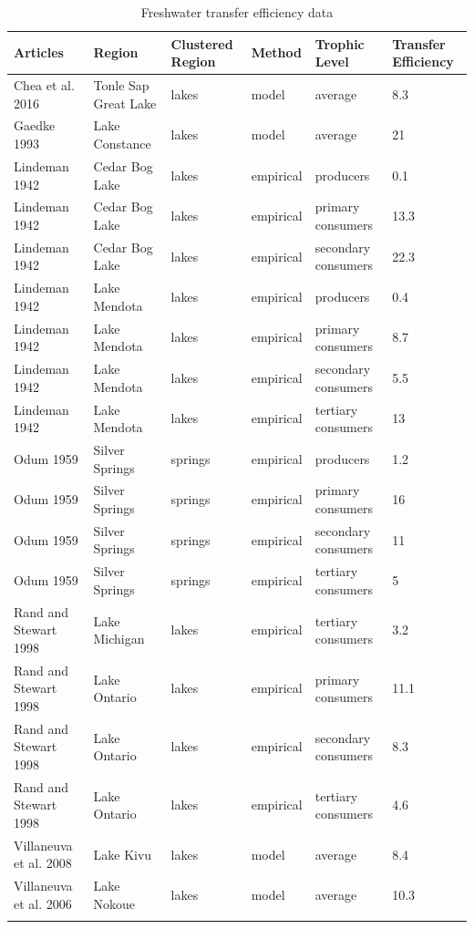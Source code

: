 \documentclass[oneside,12pt,final]{sty/ucthesis-CA2012}
\begin{document}
\begin{mainmatter}
\small %
\begin{longtable} {p{3cm}p{3cm}p{1.8cm}lp{2cm}p{1.7cm}} 
	\toprule
    Articles & Region & Clustered Region & Method & Trophic Level & Transfer Efficiency \\
    \midrule
    Chea et al. 2016   & Tonle Sap Great Lake & lakes & model & average & 8.3 \\
    Gaedke 1993   & Lake Constance & lakes & model & average & 21 \\
    Lindeman 1942   & Cedar Bog Lake & lakes & empirical & producers & 0.1 \\
    Lindeman 1942   & Cedar Bog Lake & lakes & empirical & primary consumers & 13.3 \\
    Lindeman 1942   & Cedar Bog Lake & lakes & empirical & secondary consumers & 22.3 \\
    Lindeman 1942   & Lake Mendota & lakes & empirical & producers & 0.4 \\
    Lindeman 1942   & Lake Mendota & lakes & empirical & primary consumers & 8.7 \\
    Lindeman 1942   & Lake Mendota & lakes & empirical & secondary consumers & 5.5 \\
    Lindeman 1942   & Lake Mendota & lakes & empirical & tertiary consumers & 13 \\
    Odum 1959   & Silver Springs & springs & empirical & producers & 1.2 \\
    Odum 1959   & Silver Springs & springs & empirical & primary consumers & 16 \\
    Odum 1959   & Silver Springs & springs & empirical & secondary consumers & 11 \\
    Odum 1959   & Silver Springs & springs & empirical & tertiary consumers & 5 \\
    Rand and Stewart 1998   & Lake Michigan & lakes & empirical & tertiary consumers & 3.2 \\
    Rand and Stewart 1998   & Lake Ontario & lakes & empirical & primary consumers & 11.1 \\
    Rand and Stewart 1998   & Lake Ontario & lakes & empirical & secondary consumers & 8.3 \\
    Rand and Stewart 1998   & Lake Ontario & lakes & empirical & tertiary consumers & 4.6 \\
    Villaneuva et al. 2008   & Lake Kivu & lakes & model & average & 8.4 \\
    Villaneuva et al. 2006   & Lake Nokoue & lakes & model & average & 10.3 \\
    \bottomrule
    \caption{Freshwater transfer efficiency data}
         \label{datafresh}
    \end{longtable}
\normalsize


\end{mainmatter}
\end{document}
